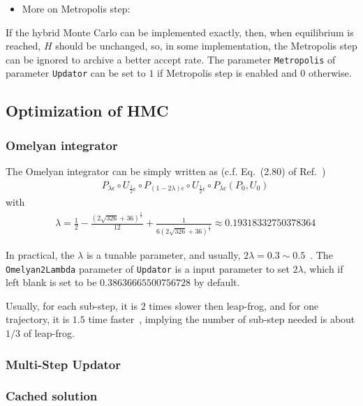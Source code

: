 \begin{itemize}
 \item More on Metropolis step:
\end{itemize}

If the hybrid Monte Carlo can be implemented exactly, then, when equilibrium is reached, $H$ should be unchanged, so, in some implementation, the Metropolis step can be ignored to archive a better accept rate. The parameter \verb"Metropolis" of parameter \verb"Updator" can be set to $1$ if Metropolis step is enabled and $0$ otherwise.

\subsection{Optimization of HMC}

\subsubsection{\label{Omelyan}Omelyan integrator}

The Omelyan integrator can be simply written as (c.f. Eq.~(2.80) of Ref.~\cite{latticeqcdbook2017})
\begin{equation}
\begin{split}
&P_{\lambda\epsilon}\circ U_{\frac{1}{2}\epsilon}\circ P_{(1-2\lambda)\epsilon}\circ U_{\frac{1}{2}\epsilon}\circ P_{\lambda\epsilon}\left(P_0,U_0\right)
\end{split}
\label{eq.hmc.update_Omelyan}
\end{equation}
with
\begin{equation}
\begin{split}
&\lambda = \frac{1}{2}-\frac{\left(2\sqrt{326}+36\right)^{\frac{1}{3}}}{12}+\frac{1}{6\left(2\sqrt{326}+36\right)^{\frac{1}{3}}}\approx 0.19318332750378364
\end{split}
\label{eq.hmc.update_Omelyan2}
\end{equation}

In practical, the $\lambda$ is a tunable parameter, and usually, $2\lambda = 0.3 \sim 0.5$~\cite{latticeqcdreview2009}. The \verb"Omelyan2Lambda" parameter of \verb"Updator" is a input parameter to set $2\lambda$, which if left blank is set to be $0.38636665500756728$ by default.

Usually, for each sub-step, it is $2$ times slower then leap-frog, and for one trajectory, it is $1.5$ time faster~\cite{latticeqcdreview2009}, implying the number of sub-step needed is about $1/3$ of leap-frog.

\subsubsection{Multi-Step Updator}

\subsubsection{Cached solution}

